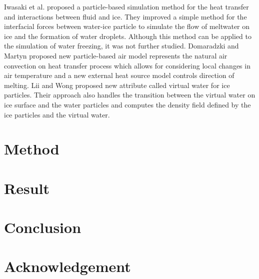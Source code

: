 \documentclass[10pt, twocolumn] {IEEEtran}
\begin{document}
 Iwasaki et al.\cite{iwasaki2010fast} proposed a particle-based simulation method for the heat transfer and interactions between fluid and ice. They improved a simple method for the interfacial forces between water-ice particle to simulate the flow of meltwater on ice and the formation of water droplets. Although this method can be applied to the simulation of water freezing, it was not further studied.
 Domaradzki and Martyn\cite{domaradzki2014improved} proposed new particle-based air model represents the natural air convection on heat transfer process  which allows for considering  local changes in air temperature and a new external heat source model controls direction of melting.
 Lii and Wong\cite{lii2014ice} proposed new attribute called virtual water for ice particles. Their approach also handles the transition between the virtual water on ice surface and the water particles and computes the density field defined by the ice particles and the virtual water.

\section{Method}
\section{Result}
\section{Conclusion}
\section{Acknowledgement}

\nocite{*}


\end{document}
